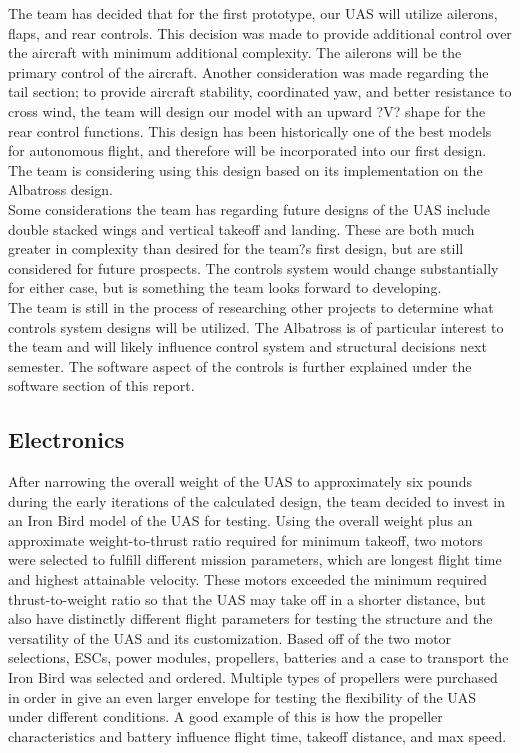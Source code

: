 \documentclass{article}
\begin{document}
\noindent The team has decided that for the first prototype, our UAS will utilize ailerons, flaps, and rear controls. This decision was made to provide additional control over the aircraft with minimum additional complexity. The ailerons will be the primary control of the aircraft. Another consideration was made regarding the tail section; to provide aircraft stability, coordinated yaw, and better resistance to cross wind, the team will design our model with an upward ?V? shape for the rear control functions. This design has been historically one of the best models for autonomous flight, and therefore will be incorporated into our first design. The team is considering using this design based on its implementation on the Albatross design. \\

\noindent Some considerations the team has regarding future designs of the UAS include double stacked wings and vertical takeoff and landing. These are both much greater in complexity than desired for the team?s first design, but are still considered for future prospects. The controls system would change substantially for either case, but is something the team looks forward to developing. \\

\noindent The team is still in the process of researching other projects to determine what controls system designs will be utilized. The Albatross is of particular interest to the team and will likely influence control system and structural decisions next semester. The software aspect of the controls is further explained under the software section of this report. \\

\subsection{Electronics}
\noindent After narrowing the overall weight of the UAS to approximately six pounds during the early iterations of the calculated design, the team decided to invest in an Iron Bird model of the UAS for testing. Using the overall weight plus an approximate weight-to-thrust ratio required for minimum takeoff, two motors were selected to fulfill different mission parameters, which are longest flight time and highest attainable velocity. These motors exceeded the minimum required thrust-to-weight ratio so that the UAS may take off in a shorter distance, but also have distinctly different flight parameters for testing the structure and the versatility of the UAS and its customization. Based off of the two motor selections, ESCs, power modules, propellers, batteries and a case to transport the Iron Bird was selected and ordered. Multiple types of propellers were purchased in order in give an even larger envelope for testing the flexibility of the UAS under different conditions. A good example of this is how the propeller characteristics and battery influence flight time, takeoff distance, and max speed. \\
\end{document}
